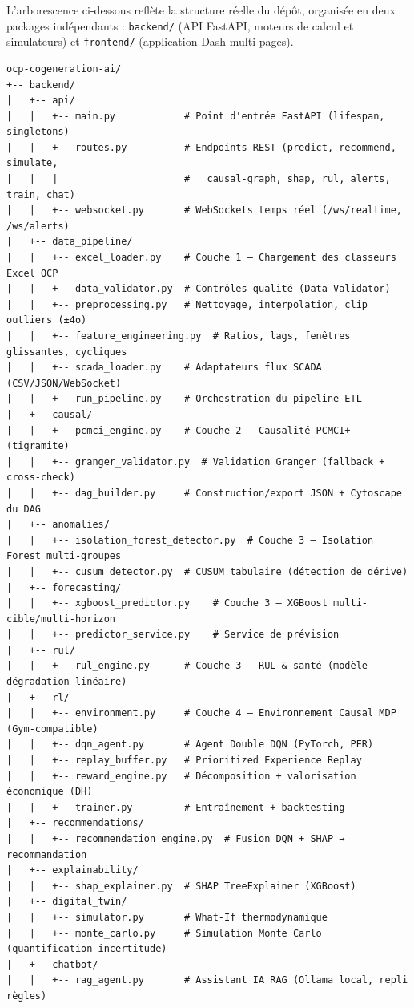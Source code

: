 L'arborescence ci-dessous reflète la structure réelle du dépôt, organisée en deux
packages indépendants : \texttt{backend/} (API FastAPI, moteurs de calcul et
simulateurs) et \texttt{frontend/} (application Dash multi-pages).

\begin{verbatim}
ocp-cogeneration-ai/
+-- backend/
|   +-- api/
|   |   +-- main.py            # Point d'entrée FastAPI (lifespan, singletons)
|   |   +-- routes.py          # Endpoints REST (predict, recommend, simulate,
|   |   |                      #   causal-graph, shap, rul, alerts, train, chat)
|   |   +-- websocket.py       # WebSockets temps réel (/ws/realtime, /ws/alerts)
|   +-- data_pipeline/
|   |   +-- excel_loader.py    # Couche 1 — Chargement des classeurs Excel OCP
|   |   +-- data_validator.py  # Contrôles qualité (Data Validator)
|   |   +-- preprocessing.py   # Nettoyage, interpolation, clip outliers (±4σ)
|   |   +-- feature_engineering.py  # Ratios, lags, fenêtres glissantes, cycliques
|   |   +-- scada_loader.py    # Adaptateurs flux SCADA (CSV/JSON/WebSocket)
|   |   +-- run_pipeline.py    # Orchestration du pipeline ETL
|   +-- causal/
|   |   +-- pcmci_engine.py    # Couche 2 — Causalité PCMCI+ (tigramite)
|   |   +-- granger_validator.py  # Validation Granger (fallback + cross-check)
|   |   +-- dag_builder.py     # Construction/export JSON + Cytoscape du DAG
|   +-- anomalies/
|   |   +-- isolation_forest_detector.py  # Couche 3 — Isolation Forest multi-groupes
|   |   +-- cusum_detector.py  # CUSUM tabulaire (détection de dérive)
|   +-- forecasting/
|   |   +-- xgboost_predictor.py    # Couche 3 — XGBoost multi-cible/multi-horizon
|   |   +-- predictor_service.py    # Service de prévision
|   +-- rul/
|   |   +-- rul_engine.py      # Couche 3 — RUL & santé (modèle dégradation linéaire)
|   +-- rl/
|   |   +-- environment.py     # Couche 4 — Environnement Causal MDP (Gym-compatible)
|   |   +-- dqn_agent.py       # Agent Double DQN (PyTorch, PER)
|   |   +-- replay_buffer.py   # Prioritized Experience Replay
|   |   +-- reward_engine.py   # Décomposition + valorisation économique (DH)
|   |   +-- trainer.py         # Entraînement + backtesting
|   +-- recommendations/
|   |   +-- recommendation_engine.py  # Fusion DQN + SHAP → recommandation
|   +-- explainability/
|   |   +-- shap_explainer.py  # SHAP TreeExplainer (XGBoost)
|   +-- digital_twin/
|   |   +-- simulator.py       # What-If thermodynamique
|   |   +-- monte_carlo.py     # Simulation Monte Carlo (quantification incertitude)
|   +-- chatbot/
|   |   +-- rag_agent.py       # Assistant IA RAG (Ollama local, repli règles)

\end{verbatim}
